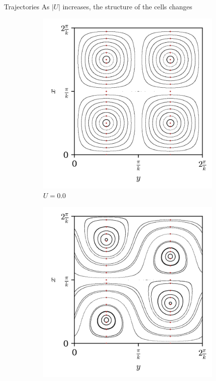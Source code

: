 \documentclass[10pt]{beamer}
\begin{document}
\begin{frame}{Trajectories}
As $|U|$ increases, the structure of the cells changes

\begin{figure}[h]
\begin{subfigure}[b]{0.3\textwidth}
    \includegraphics[width=\textwidth]{graf_1onda/map2_data-map2_U_p0.0000.png}
    \caption{$U = 0.0$}
\end{subfigure}
\begin{subfigure}[b]{0.3\textwidth}
    \includegraphics[width=\textwidth]{graf_1onda/map2_data-map2_U_p0.4000.png}

\end{subfigure}
\end{figure}
\end{frame}
\end{document}
